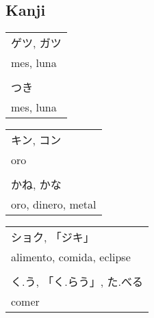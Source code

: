 \documentclass[a4paper,12pt,oneside]{report}
\begin{document}
\begin{CJK*}{UTF8}{min}


  \chapter{Kanji}
  \thispagestyle{contenido} %
  \pagestyle{contenido}     %

  \begin{minipage}{1.2in}
  \end{minipage}
  \begin{minipage}{3in}
    \begin{tabular}{l}
      ゲツ, ガツ \\
      mes, luna \\
      \\
      つき \\
      mes, luna
    \end{tabular}
  \end{minipage}

  \begin{minipage}{1.2in}
  \end{minipage}
  \begin{minipage}{3in}
    \begin{tabular}{l}
      キン, コン \\
      oro \\
      \\
      かね, かな \\
      oro, dinero, metal \\
    \end{tabular}
  \end{minipage}

  \begin{minipage}{1.2in}
  \end{minipage}
  \begin{minipage}{3in}
    \begin{tabular}{l}
      ショク, 「ジキ」 \\
      alimento, comida, eclipse\\
      \\
      く.う, 「く.らう」, た.べる \\
      comer
    \end{tabular}
  \end{minipage}


\end{CJK*}
\end{document}
